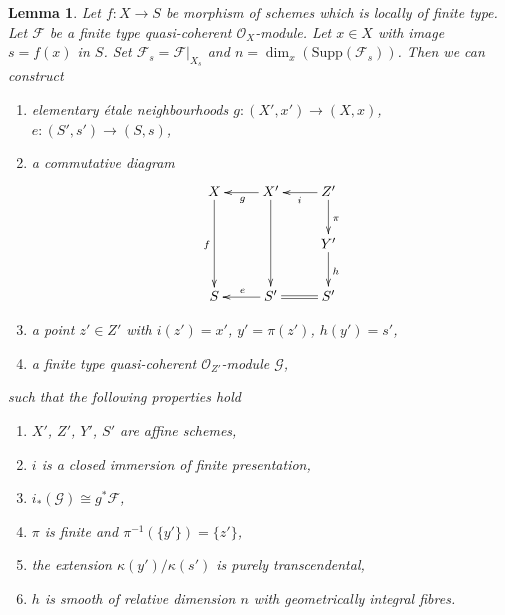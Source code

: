 \documentclass[10pt,a4paper]{amsart}
\theoremstyle{plain}
\newtheorem{lemma}[subsection]{Lemma}
\theoremstyle{definition}
\theoremstyle{remark}
\numberwithin{equation}{subsection}
\begin{document}
\begin{lemma}
\label{lemma-elementary-devissage}
Let $f : X \to S$ be morphism of schemes which is locally of finite type.
Let $\mathcal{F}$ be a finite type quasi-coherent $\mathcal{O}_X$-module.
Let $x \in X$ with image $s = f(x)$ in $S$.
Set $\mathcal{F}_s = \mathcal{F}|_{X_s}$ and
$n = \dim_x(\text{Supp}(\mathcal{F}_s))$.
Then we can construct
\begin{enumerate}
\item elementary \'etale neighbourhoods $g : (X', x') \to (X, x)$,
$e : (S', s') \to (S, s)$,
\item a commutative diagram
$$
\xymatrix{
X \ar[dd]_f & X' \ar[dd] \ar[l]^g & Z' \ar[l]^i \ar[d]^\pi \\
& & Y' \ar[d]^h \\
S & S' \ar[l]_e & S' \ar@{=}[l]
}
$$
\item a point $z' \in Z'$ with $i(z') = x'$, $y' = \pi(z')$, $h(y') = s'$,
\item a finite type quasi-coherent $\mathcal{O}_{Z'}$-module $\mathcal{G}$,
\end{enumerate}
such that the following properties hold
\begin{enumerate}
\item $X'$, $Z'$, $Y'$, $S'$ are affine schemes,
\item $i$ is a closed immersion of finite presentation,
\item $i_*(\mathcal{G}) \cong g^*\mathcal{F}$,
\item $\pi$ is finite and $\pi^{-1}(\{y'\}) = \{z'\}$,
\item the extension $\kappa(y')/\kappa(s')$ is purely transcendental,
\item $h$ is smooth of relative dimension $n$
with geometrically integral fibres.
\end{enumerate}
\end{lemma}
\end{document}
